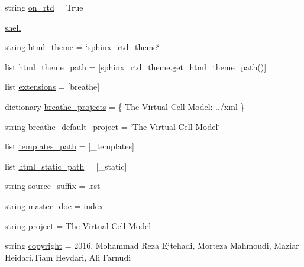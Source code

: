 \begin{DoxyCompactItemize}
\item 
string \mbox{\hyperlink{namespaceconf_ac9f32ab656bf05ad872fd46e03504cc8}{on\+\_\+rtd}} = \textquotesingle{}True\textquotesingle{}
\item 
\mbox{\hyperlink{namespaceconf_a332f430461432dc465213f884a1e4967}{shell}}
\item 
string \mbox{\hyperlink{namespaceconf_a6c3bfcc1a44546c1c75ce20f55bd0fd6}{html\+\_\+theme}} = \char`\"{}sphinx\+\_\+rtd\+\_\+theme\char`\"{}
\item 
list \mbox{\hyperlink{namespaceconf_a4960231f83b1b44a1ffcd212903b62e8}{html\+\_\+theme\+\_\+path}} = \mbox{[}sphinx\+\_\+rtd\+\_\+theme.\+get\+\_\+html\+\_\+theme\+\_\+path()\mbox{]}
\item 
list \mbox{\hyperlink{namespaceconf_ae475e080536acb271a0a0efe56c3ba42}{extensions}} = \mbox{[}\textquotesingle{}breathe\textquotesingle{}\mbox{]}
\item 
dictionary \mbox{\hyperlink{namespaceconf_acb47d2c0c2904fa7d36b63142533f383}{breathe\+\_\+projects}} = \{ \textquotesingle{}The Virtual Cell Model\textquotesingle{}\+: \textquotesingle{}../xml\textquotesingle{} \}
\item 
string \mbox{\hyperlink{namespaceconf_a6eba2d2c7ae923054b1c49e686ec89b9}{breathe\+\_\+default\+\_\+project}} = \char`\"{}The Virtual Cell Model\char`\"{}
\item 
list \mbox{\hyperlink{namespaceconf_ae850ae634911b713e036b43894fdd525}{templates\+\_\+path}} = \mbox{[}\textquotesingle{}\+\_\+templates\textquotesingle{}\mbox{]}
\item 
list \mbox{\hyperlink{namespaceconf_af4fb5d8851ccaade135c2668dd3ced41}{html\+\_\+static\+\_\+path}} = \mbox{[}\textquotesingle{}\+\_\+static\textquotesingle{}\mbox{]}
\item 
string \mbox{\hyperlink{namespaceconf_a10af2a769eb3bd3322e874f677e435b1}{source\+\_\+suffix}} = \textquotesingle{}.rst\textquotesingle{}
\item 
string \mbox{\hyperlink{namespaceconf_a6fcd7e5236f355b1e1a55f9d95988810}{master\+\_\+doc}} = \textquotesingle{}index\textquotesingle{}
\item 
string \mbox{\hyperlink{namespaceconf_a45653c983098153b78e33600e39230eb}{project}} = \textquotesingle{}The Virtual Cell Model\textquotesingle{}
\item 
string \mbox{\hyperlink{namespaceconf_a33fa97cf51dcb25970fbf53f10159589}{copyright}} = \textquotesingle{}2016, Mohammad Reza Ejtehadi, Morteza Mahmoudi, Maziar Heidari,Tiam Heydari, Ali Farnudi\textquotesingle{}

\end{DoxyCompactItemize}
